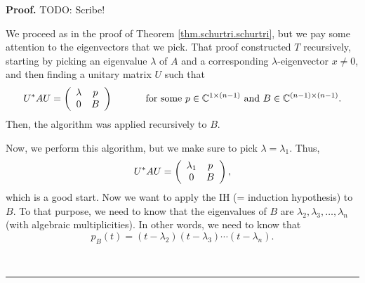 \documentclass[numbers=enddot,12pt,final,onecolumn,notitlepage]{scrartcl}%
\numberwithin{exer}{subsection}
\theoremstyle{definition}
\newenvironment{proof}[1][Proof]{\noindent\textbf{#1.} }{\ \rule{0.5em}{0.5em}}
\begin{document}
\begin{proof}
TODO: Scribe!

We proceed as in the proof of Theorem \ref{thm.schurtri.schurtri}, but we pay
some attention to the eigenvectors that we pick. That proof constructed $T$
recursively, starting by picking an eigenvalue $\lambda$ of $A$ and a
corresponding $\lambda$-eigenvector $x\neq0$, and then finding a unitary
matrix $U$ such that%
\[
U^{\ast}AU=\left(
\begin{array}
[c]{cc}%
\lambda & p\\
0 & B
\end{array}
\right)  \ \ \ \ \ \ \ \ \ \ \text{for some }p\in\mathbb{C}^{1\times\left(
n-1\right)  }\text{ and }B\in\mathbb{C}^{\left(  n-1\right)  \times\left(
n-1\right)  }.
\]
Then, the algorithm was applied recursively to $B$.

Now, we perform this algorithm, but we make sure to pick $\lambda=\lambda_{1}%
$. Thus,%
\[
U^{\ast}AU=\left(
\begin{array}
[c]{cc}%
\lambda_{1} & p\\
0 & B
\end{array}
\right)  ,
\]
which is a good start. Now we want to apply the IH (= induction hypothesis) to
$B$. To that purpose, we need to know that the eigenvalues of $B$ are
$\lambda_{2},\lambda_{3},\ldots,\lambda_{n}$ (with algebraic multiplicities).
In other words, we need to know that%
\[
p_{B}\left(  t\right)  =\left(  t-\lambda_{2}\right)  \left(  t-\lambda
_{3}\right)  \cdots\left(  t-\lambda_{n}\right)  .
\]



\end{proof}
\end{document}
